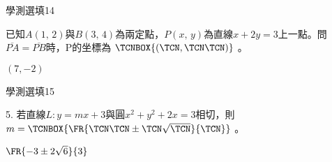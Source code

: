 \begin{QUESTIONS}
\begin{QUESTION}
        \begin{ExamInfo}{83}{學測}{選填}{14}
        \end{ExamInfo}
        \begin{ExamAnsRateInfo}{}{}{}{}
        \end{ExamAnsRateInfo}
        \begin{QBODY}
            已知$A\left( 1,\,2 \right)$與$B\left( 3,\,4 \right)$為兩定點，$P\left( x,\,y \right)$為直線$x+2y=3$上一點。問$\overline{PA}=\overline{PB}$時，P的坐標為 $\TCNBOX{(\TCN,\TCN\TCN)}$ 。
        \end{QBODY}
        \begin{QFROMS}
        \end{QFROMS}
        \begin{QTAGS}\end{QTAGS}
        \begin{QANS}
            $(7,-2)$
        \end{QANS}
        \begin{QSOLLIST}
        \end{QSOLLIST}
        \begin{QEMPTYSPACE}
        \end{QEMPTYSPACE}
    \end{QUESTION}
    \begin{QUESTION}
        \begin{ExamInfo}{83}{學測}{選填}{15}
        \end{ExamInfo}
        \begin{ExamAnsRateInfo}{}{}{}{}
        \end{ExamAnsRateInfo}
        \begin{QBODY}
            5.	若直線$L:y=mx+3$與圓${{x}^{2}}+{{y}^{2}}+2x=3$相切，則$m=\TCNBOX{\FR{\TCN\TCN \pm \TCN \sqrt{\TCN}}{\TCN}}$ 。
        \end{QBODY}
        \begin{QFROMS}
        \end{QFROMS}
        \begin{QTAGS}\end{QTAGS}
        \begin{QANS}
            $\FR{-3\pm 2\sqrt{6}}{3}$
        \end{QANS}
        \begin{QSOLLIST}
        \end{QSOLLIST}
        \begin{QEMPTYSPACE}
        \end{QEMPTYSPACE}
    \end{QUESTION}

\end{QUESTIONS}
